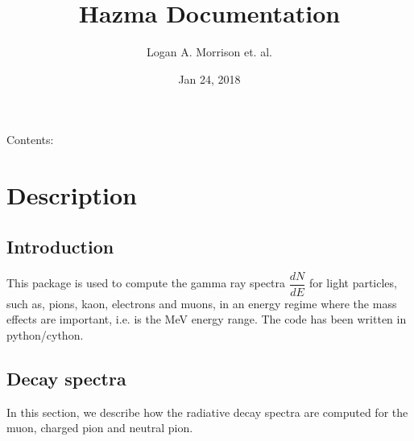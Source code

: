 \documentclass[letterpaper,10pt,english]{sphinxmanual}
\title{Hazma Documentation}
\date{Jan 24, 2018}
\author{Logan A. Morrison et. al.}
\begin{document}
\maketitle
\sphinxtableofcontents
{}\label{\detokenize{index::doc}}


Contents:


\chapter{Description}
\label{\detokenize{description::doc}}\label{\detokenize{description:description}}\label{\detokenize{description:welcome-to-hazma-s-documentation}}

\section{Introduction}
\label{\detokenize{description:introduction}}
This package is used to compute the gamma ray spectra \(\dfrac{dN}{dE}\) for light particles, such as, pions, kaon, electrons and muons, in an energy regime where the mass effects are important, i.e. is the MeV energy range. The code has been written in python/cython.


\section{Decay spectra}
\label{\detokenize{description:decay-spectra}}
In this section, we describe how the radiative decay spectra are computed for the muon, charged pion and neutral pion.
\end{document}
